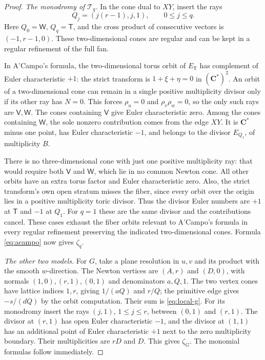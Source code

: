 \documentclass[11pt]{article}
\numberwithin{equation}{section}
\theoremstyle{definition}
\theoremstyle{remark}
\newcommand{\CC}{\mathbf C}
\begin{document}
\begin{proof}
\emph{The monodromy of $\mathcal T_q$.}
In the cone
dual to $XY$, insert the rays
\[
 Q_j=(j(r-1),j,1),\qquad 0\le j\le q.
\]
Here $Q_0=\mathsf W$, $Q_q=\mathsf T$, and the cross product
of consecutive vectors is $(-1,r-1,0)$. These two-dimensional
cones are regular and can be kept in a regular refinement of
the full fan.

In A'Campo's formula, the two-dimensional torus orbit of
$E_{\mathsf T}$ has complement of Euler characteristic $+1$:
the strict transform is $1+\xi+\eta=0$ in $(\CC^*)^2$.
An orbit of a two-dimensional cone can remain in a single
positive multiplicity divisor only if its other ray has
$N=0$. This forces $\rho_u=0$ and $\rho_v\rho_w=0$,
so the only such rays are $\mathsf V,\mathsf W$.
The cones containing $\mathsf V$ give Euler characteristic
zero. Among the cones containing $\mathsf W$, the sole
nonzero contribution comes from the edge $XY$. It is
$\CC^*$ minus one point, has Euler characteristic $-1$,
and belongs to the divisor $E_{Q_1}$, of multiplicity $B$.

There is no three-dimensional cone with just one positive
multiplicity ray: that would require both $\mathsf V$ and
$\mathsf W$, which lie in no common Newton cone. All other
orbits have an extra torus factor and Euler characteristic
zero. Also, the strict transform's own open stratum misses
the fiber, since every orbit over the origin lies in a
positive multiplicity toric divisor. Thus the divisor Euler
numbers are $+1$ at $\mathsf T$ and $-1$ at $Q_1$. For $q=1$
these are the same divisor and the contributions cancel.
These cases exhaust the fiber orbits relevant to A'Campo's
formula in every regular refinement preserving the indicated
two-dimensional cones.
Formula \eqref{eq:acampo} now gives $\zeta_q$.

\emph{The other two models.}
For $G$, take a plane resolution in $u,v$ and its product
with the smooth $w$-direction. The Newton vertices are
$(A,r)$ and $(D,0)$, with normals $(1,0),(r,1),(0,1)$
and denominators $a,Q,1$. The two vertex cones have lattice
indices $1,r$, giving $1/(aQ)$ and $r/Q$; the primitive
edge gives $-s/(dQ)$ by the orbit computation.
Their sum is \eqref{eq:local-g}.
For its monodromy insert the rays $(j,1)$, $1\le j\le r$,
between $(0,1)$ and $(r,1)$. The divisor at $(r,1)$ has open
Euler characteristic $-1$, and the divisor at $(1,1)$ has
an additional point of Euler characteristic $+1$ next to
the zero multiplicity boundary. Their multiplicities are
$rD$ and $D$. This gives $\zeta_G$. The monomial formulas
follow immediately.
\end{proof}
\end{document}
